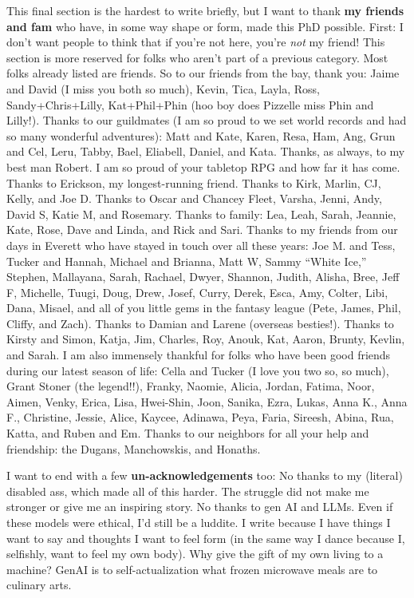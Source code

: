 \documentclass[12pt]{cmuthesis}
\begin{document}
This final section is the hardest to write briefly, but I want to thank \textbf{my friends and fam} who have, in some way shape or form, made this PhD possible. First: I don't want people to think that if you're not here, you're \textit{not} my friend! This section is more reserved for folks who aren't part of a previous category. Most folks already listed are friends. So to our friends from the bay, thank you: Jaime and David (I miss you both so much), Kevin, Tica, Layla, Ross, Sandy+Chris+Lilly, Kat+Phil+Phin (hoo boy does Pizzelle miss Phin and Lilly!). Thanks to our guildmates (I am so proud to we set world records and had so many wonderful adventures): Matt and Kate, Karen, Resa, Ham, Ang, Grun and Cel, Leru, Tabby, Bael, Eliabell, Daniel, and Kata. Thanks, as always, to my best man Robert. I am so proud of your tabletop RPG and how far it has come. Thanks to Erickson, my longest-running friend. Thanks to Kirk, Marlin, CJ, Kelly, and Joe D. Thanks to Oscar and Chancey Fleet, Varsha, Jenni, Andy, David S, Katie M, and Rosemary. Thanks to family: Lea, Leah, Sarah, Jeannie, Kate, Rose, Dave and Linda, and Rick and Sari. Thanks to my friends from our days in Everett who have stayed in touch over all these years: Joe M. and Tess, Tucker and Hannah, Michael and Brianna, Matt W, Sammy ``White Ice,'' Stephen, Mallayana, Sarah, Rachael, Dwyer, Shannon, Judith, Alisha, Bree, Jeff F, Michelle, Tuugi, Doug, Drew, Josef, Curry, Derek, Esca, Amy, Colter, Libi, Dana, Misael, and all of you little gems in the fantasy league (Pete, James, Phil, Cliffy, and Zach). Thanks to Damian and Larene (overseas besties!). Thanks to Kirsty and Simon, Katja, Jim, Charles, Roy, Anouk, Kat, Aaron, Brunty, Kevlin, and Sarah. I am also immensely thankful for folks who have been good friends during our latest season of life: Cella and Tucker (I love you two so, so much), Grant Stoner (the legend!!), Franky, Naomie, Alicia, Jordan, Fatima, Noor, Aimen, Venky, Erica, Lisa, Hwei-Shin, Joon, Sanika, Ezra, Lukas, Anna K., Anna F., Christine, Jessie, Alice, Kaycee, Adinawa, Peya, Faria, Sireesh, Abina, Rua, Katta, and Ruben and Em. Thanks to our neighbors for all your help and friendship: the Dugans, Manchowskis, and Honaths.

I want to end with a few \textbf{un-acknowledgements} too: No thanks to my (literal) disabled ass, which made all of this harder. The struggle did not make me stronger or give me an inspiring story. No thanks to gen AI and LLMs. Even if these models were ethical, I'd still be a luddite. I write because I have things I want to say and thoughts I want to feel form (in the same way I dance because I, selfishly, want to feel my own body). Why give the gift of my own living to a machine? GenAI is to self-actualization what frozen microwave meals are to culinary arts.
\end{document}
